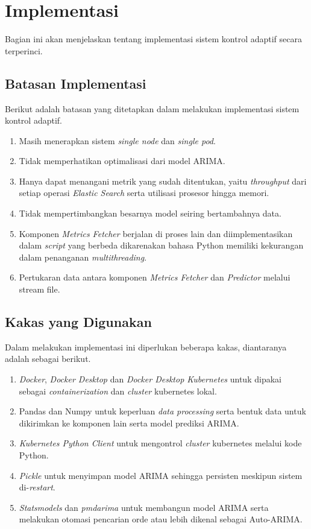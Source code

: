 \section{Implementasi}

Bagian ini akan menjelaskan tentang implementasi sistem kontrol adaptif secara terperinci.

\subsection{Batasan Implementasi}
Berikut adalah batasan yang ditetapkan dalam melakukan implementasi sistem kontrol adaptif.
\begin{enumerate}
    \item Masih menerapkan sistem \textit{single node} dan \textit{single pod}.
    \item Tidak memperhatikan optimalisasi dari model ARIMA.
    \item Hanya dapat menangani metrik yang sudah ditentukan, yaitu \textit{throughput} dari setiap operasi \textit{Elastic Search} serta utilisasi prosesor hingga memori.
    \item Tidak mempertimbangkan besarnya model seiring bertambahnya data.
    \item Komponen \textit{Metrics Fetcher} berjalan di proses lain dan diimplementasikan dalam \textit{script} yang berbeda dikarenakan bahasa Python memiliki kekurangan dalam penanganan \textit{multithreading}.
    \item Pertukaran data antara komponen \textit{Metrics Fetcher} dan \textit{Predictor} melalui stream file.
\end{enumerate}

\subsection{Kakas yang Digunakan}
Dalam melakukan implementasi ini diperlukan beberapa kakas, diantaranya adalah sebagai berikut.
\begin{enumerate}
    \item \textit{Docker}, \textit{Docker Desktop} dan \textit{Docker Desktop Kubernetes} untuk dipakai sebagai \textit{containerization} dan \textit{cluster} kubernetes lokal.
    \item Pandas dan Numpy untuk keperluan \textit{data processing} serta bentuk data untuk dikirimkan ke komponen lain serta model prediksi ARIMA.
    \item \textit{Kubernetes Python Client} untuk mengontrol \textit{cluster} kubernetes melalui kode Python.
    \item \textit{Pickle} untuk menyimpan model ARIMA sehingga persisten meskipun sistem di-\textit{restart}.
    \item \textit{Statsmodels} dan \textit{pmdarima} untuk membangun model ARIMA serta melakukan otomasi pencarian orde atau lebih dikenal sebagai Auto-ARIMA.
\end{enumerate}

